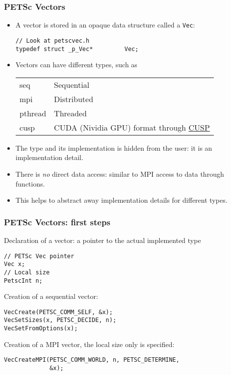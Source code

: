\begin{frame}[fragile]
  \frametitle{PETSc Vectors}
  \begin{itemize}
  \item A vector is stored in an opaque data structure called a \texttt{Vec}:
\begin{lstlisting}[style=c]
// Look at petscvec.h
typedef struct _p_Vec*         Vec;
\end{lstlisting}
  \item Vectors can have different types, such as
    \begin{tabular}{ll}
    seq     & Sequential \\
    mpi     & Distributed \\
    pthread & Threaded \\
    cusp    & CUDA (Nividia GPU) format through \href{https://cusplibrary.github.io/}{CUSP}
    \end{tabular}
  \item The type and its implementation is hidden from the user: it is an
    implementation detail.
  \item There is \emph{no} direct data access: similar to MPI access to data through
    functions.
  \item This helps to abstract away implementation details for different
    types.
  \end{itemize}
\end{frame}

\begin{frame}[fragile]
  \frametitle{PETSc Vectors: first steps}

Declaration of a vector: a pointer to the actual implemented type 
\begin{lstlisting}[style=c]
// PETSc Vec pointer
Vec x;
// Local size
PetscInt n;
\end{lstlisting}

\medskip
Creation of a sequential vector:
\begin{lstlisting}[style=c]
VecCreate(PETSC_COMM_SELF, &x);
VecSetSizes(x, PETSC_DECIDE, n);
VecSetFromOptions(x);
\end{lstlisting}

\medskip
Creation of a MPI vector, the local size only is specified:
\begin{lstlisting}[style=c]
VecCreateMPI(PETSC_COMM_WORLD, n, PETSC_DETERMINE,
             &x);
\end{lstlisting}

\end{frame}

